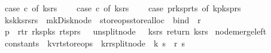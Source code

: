 \begin{isabellebody}
\ \ case\ c{}\ of\ {\isacharparenleft}ks{}{\isacharcomma}rs{}{\isacharparenright}\ {\isasymRightarrow}\ \isanewline
\ \ case\ c{}\ of\ {\isacharparenleft}ks{}{\isacharcomma}rs{}{\isacharparenright}\ {\isasymRightarrow}\ \isanewline
\ \ case\ {\isacharparenleft}p{\isacharbar}{\isachargreater}r{\isacharunderscore}ks{}{\isacharcomma}p{\isacharbar}{\isachargreater}r{\isacharunderscore}ts{}{\isacharparenright}\ of\ {\isacharparenleft}k{}{\isacharhash}p{\isacharunderscore}ks{}{\isacharcomma}{\isacharunderscore}{\isacharhash}p{\isacharunderscore}rs{}{\isacharparenright}\ {\isasymRightarrow}\ \ \ \isanewline
\ \ {\isacharparenleft}ks{}{\isacharat}{\isacharbrackleft}k{}{\isacharbrackright}{\isacharat}ks{}{\isacharcomma}rs{}{\isacharat}rs{}{\isacharparenright}\ {\isacharbar}{\isachargreater}\ mk{\isacharunderscore}Disk{\isacharunderscore}node\ {\isacharbar}{\isachargreater}\ {\isacharparenleft}store{\isacharunderscore}ops{\isacharbar}{\isachargreater}store{\isacharunderscore}alloc{\isacharparenright}\ {\isacharbar}{\isachargreater}\ bind\ {\isacharparenleft}{\isacharpercent}\ r{}{\isachardot}\ \isanewline
\ \ p\ {\isasymlparr}\ r{\isacharunderscore}t{\isacharcolon}{\isacharequal}r{}{\isacharcomma}\ r{\isacharunderscore}ks{}{\isacharcolon}{\isacharequal}p{\isacharunderscore}ks{}{\isacharcomma}\ r{\isacharunderscore}ts{}{\isacharcolon}{\isacharequal}p{\isacharunderscore}rs{}\ {\isasymrparr}\ {\isacharbar}{\isachargreater}\ unsplit{\isacharunderscore}node\ {\isacharbar}{\isachargreater}\ {\isacharparenleft}{\isacharpercent}\ {\isacharparenleft}ks{\isacharcomma}rs{\isacharparenright}{\isachardot}\ return\ {\isacharparenleft}ks{\isacharcomma}rs{\isacharparenright}{\isacharparenright}{\isacharparenright}{\isacharparenright}{\isachardoublequoteclose}\isanewline
\isanewline
\isanewline
{}\isamarkupfalse%
\ node{\isacharunderscore}merge{\isacharunderscore}left\ {\isacharcolon}{\isacharcolon}\ \isanewline
\ \ {\isachardoublequoteopen}constants\ {\isasymRightarrow}\ {\isacharparenleft}{\isacharprime}k{\isacharcomma}{\isacharprime}v{\isacharcomma}{\isacharprime}r{\isacharcomma}{\isacharprime}t{\isacharparenright}store{\isacharunderscore}ops\ {\isasymRightarrow}\ {\isacharparenleft}{\isacharprime}k{\isacharcomma}{\isacharprime}r{\isacharparenright}rsplit{\isacharunderscore}node\ {\isasymRightarrow}\ {\isacharparenleft}{\isacharprime}k\ s\ {\isacharasterisk}\ {\isacharprime}r\ s{\isacharparenright}\ {\isasymRightarrow}\ \isanewline

\end{isabellebody}
